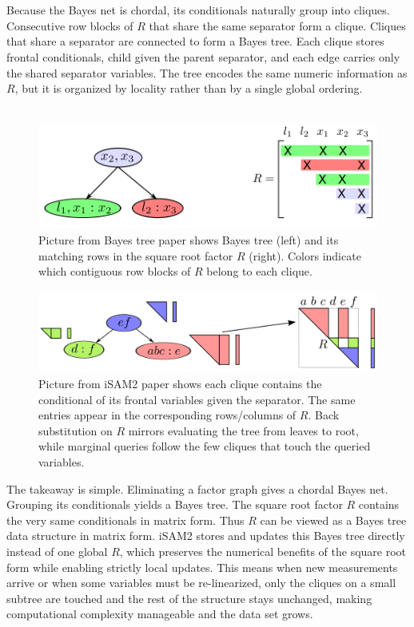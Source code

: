 \\ \\
Because the Bayes net is chordal, its conditionals naturally group into cliques. Consecutive row blocks of $R$ that share the same separator form a clique. Cliques that share a separator are connected to form a Bayes tree. Each clique stores frontal conditionals, child given the parent separator, and each edge carries only the shared separator variables. The tree encodes the same numeric information as $R$, but it is organized by locality rather than by a single global ordering.
\\ \\
\begin{figure}[H]
    \centering
    \includegraphics[width=0.98\linewidth]{Pictures/Optimizers/iSAM2/R_matrix_as_bayes_tree1.png}
    \caption{Picture from Bayes tree paper \cite{Bayes_tree_for_SLAM_paper} shows Bayes tree (left) and its matching rows in the square root factor $R$ (right). Colors indicate which contiguous row blocks of $R$ belong to each clique.}
    \label{fig:optimizer-iSAM2-R-to-tree-1}
\end{figure}
\begin{figure}[H]
    \centering
    \includegraphics[width=0.98\linewidth]{Pictures/Optimizers/iSAM2/R_matrix_as_bayes_tree2.png}
    \caption{Picture from iSAM2 paper \cite{iSAM2_paper} shows each clique contains the conditional of its frontal variables given the separator. The same entries appear in the corresponding rows/columns of $R$. Back substitution on $R$ mirrors evaluating the tree from leaves to root, while marginal queries follow the few cliques that touch the queried variables.}
    \label{fig:optimizer-iSAM2-R-to-tree-2}
\end{figure}
\noindent
The takeaway is simple. Eliminating a factor graph gives a chordal Bayes net. Grouping its conditionals yields a Bayes tree. The square root factor $R$ contains the very same conditionals in matrix form. Thus $R$ can be viewed as a Bayes tree data structure in matrix form. iSAM2 stores and updates this Bayes tree directly instead of one global $R$, which preserves the numerical benefits of the square root form while enabling strictly local updates. This means when new measurements arrive or when some variables must be re-linearized, only the cliques on a small subtree are touched and the rest of the structure stays unchanged, making computational complexity manageable and the data set grows.



